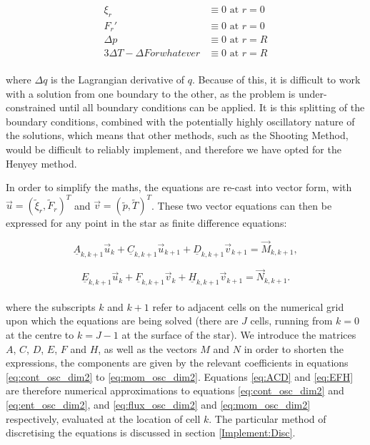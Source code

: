 \documentclass[11pt]{amsart}
\begin{document}
\begin{align}
\xi_{r} &\equiv 0 \text{ at } r = 0 \\
F_{r}' &\equiv 0 \text{ at } r = 0 \\
\Delta p &\equiv  0 \text{ at } r = R \\
3 \Delta T - \Delta F or whatever &\equiv  0 \text{ at } r = R
\end{align}
\\

where $\Delta q$ is the Lagrangian derivative of $q$.  Because of this, it is difficult to work with a solution from one boundary to the other, as the problem is under-constrained until all boundary conditions can be applied.  It is this splitting of the boundary conditions, combined with the potentially highly oscillatory nature of the solutions, which means that other methods, such as the Shooting Method, would be difficult to reliably implement, and therefore we have opted for the Henyey method.

In order to simplify the maths, the equations are re-cast into vector form, with $\vec{u} = \left( \tilde{\xi}_{r}, \tilde{F}_{r} \right)^{T}$ and $\vec{v} = \left( \tilde{p}, \tilde{T} \right)^{T}$.  These two vector equations can then be expressed for any point in the star as finite difference equations:

\begin{equation} \label{eq:ACD}
\underline{A}_{k,k+1} \vec{u}_{k} + \underline{C}_{k,k+1} \vec{u}_{k+1} + \underline{D}_{k,k+1} \vec{v}_{k+1} = \vec{M}_{k,k+1},
\end{equation} 

\begin{equation} \label{eq:EFH}
\underline{E}_{k,k+1} \vec{u}_{k} + \underline{F}_{k,k+1} \vec{v}_{k} + \underline{H}_{k,k+1} \vec{v}_{k+1} = \vec{N}_{k,k+1}.
\end{equation} 
\\

where the subscripts $k$ and $k+1$ refer to adjacent cells on the numerical grid upon which the equations are being solved (there are $J$ cells, running from $k = 0$ at the centre to $k = J - 1$ at the surface of the star).  We introduce the matrices $A$, $C$, $D$, $E$, $F$ and $H$, as well as the vectors $M$ and $N$ in order to shorten the expressions, the components are given by the relevant coefficients in equations \ref{eq:cont_osc_dim2} to \ref{eq:mom_osc_dim2}.  Equations \ref{eq:ACD} and \ref{eq:EFH} are therefore numerical approximations to equations \ref{eq:cont_osc_dim2} and \ref{eq:ent_osc_dim2}, and \ref{eq:flux_osc_dim2} and \ref{eq:mom_osc_dim2} respectively, evaluated at the location of cell $k$.  The particular method of discretising the equations is discussed in section \ref{Implement:Disc}.
\end{document}
